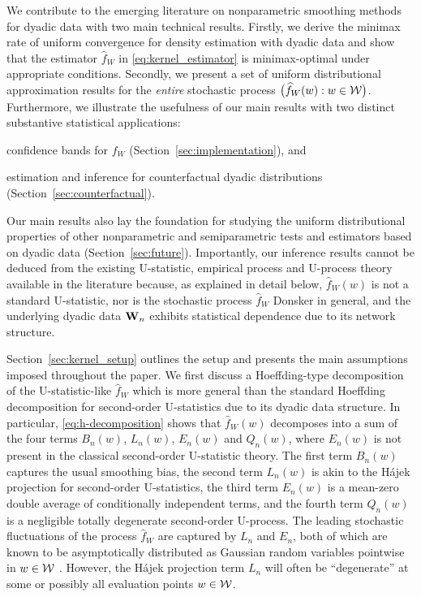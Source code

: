 We contribute to the emerging
literature on nonparametric smoothing methods
for dyadic data with two main technical
results. Firstly, we derive the minimax rate of uniform convergence for density
estimation with dyadic data and show that the estimator
$\widehat{f}_W$ in \eqref{eq:kernel_estimator}
is minimax-optimal under appropriate conditions.
Secondly, we present a set of
uniform distributional approximation results
for the \emph{entire} stochastic process $\big(\widehat{f}_W(w):w\in\mathcal{W}\big)$.
Furthermore, we illustrate the usefulness of our main results
with two distinct substantive statistical applications:
%
\begin{inlineroman}
  \item
  confidence bands for $f_W$
  (Section~\ref{sec:implementation}), and
  \item
  estimation and inference for counterfactual
  dyadic distributions (Section~\ref{sec:counterfactual}).
\end{inlineroman}
%
Our main results also lay the
foundation for studying the uniform distributional properties of other
nonparametric and semiparametric tests and estimators based on
dyadic data (Section~\ref{sec:future}).
Importantly, our inference
results cannot be deduced from the existing U-statistic, empirical process and
U-process theory available in the literature
\citep{van1996weak,gine2021mathematical} because,
as explained in detail below,
$\widehat{f}_W(w)$ is not a standard U-statistic,
nor is the stochastic process $\widehat{f}_W$ Donsker in general,
and the underlying dyadic data $\mathbf{W}_n$ exhibits
statistical dependence due to its network structure.

Section~\ref{sec:kernel_setup} outlines the setup and presents the main
assumptions
imposed throughout the paper. We first discuss a Hoeffding-type decomposition of
the U-statistic-like $\widehat{f}_W$ which is more general than the standard
Hoeffding decomposition for second-order U-statistics due
to its dyadic data structure.
In particular,
\eqref{eq:h-decomposition} shows that $\widehat{f}_W(w)$ decomposes into a sum
of the four terms $B_n(w)$, $L_n(w)$, $E_n(w)$ and $Q_n(w)$,
where $E_n(w)$ is not present in the classical second-order U-statistic theory.
The first term $B_n(w)$ captures the usual smoothing bias, the second term
$L_n(w)$ is akin to the H\'{a}jek projection for second-order U-statistics, the
third term $E_n(w)$ is a mean-zero double
average of conditionally independent terms,
and the fourth term $Q_n(w)$ is a negligible totally degenerate
second-order U-process.
The leading stochastic
fluctuations of the process $\widehat{f}_W$
are captured by $L_n$ and $E_n$,
both of which are known to be asymptotically distributed
as Gaussian random variables pointwise in $w\in\mathcal{W}$ \citep{graham2022kernel}.
However, the H\'{a}jek projection term $L_n$ will often
be ``degenerate'' at some
or possibly all evaluation points $w\in\mathcal{W}$.

